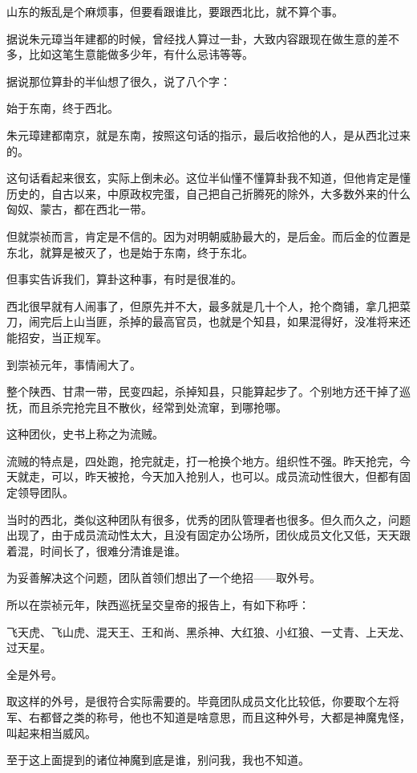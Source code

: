 	\begin{multicols}{\theparacolNo}
\fi
山东的叛乱是个麻烦事，但要看跟谁比，要跟西北比，就不算个事。

据说朱元璋当年建都的时候，曾经找人算过一卦，大致内容跟现在做生意的差不多，比如这笔生意能做多少年，有什么忌讳等等。

据说那位算卦的半仙想了很久，说了八个字：

始于东南，终于西北。

朱元璋建都南京，就是东南，按照这句话的指示，最后收拾他的人，是从西北过来的。

这句话看起来很玄，实际上倒未必。这位半仙懂不懂算卦我不知道，但他肯定是懂历史的，自古以来，中原政权完蛋，自己把自己折腾死的除外，大多数外来的什么匈奴、蒙古，都在西北一带。

但就崇祯而言，肯定是不信的。因为对明朝威胁最大的，是后金。而后金的位置是东北，就算是被灭了，也是始于东南，终于东北。

但事实告诉我们，算卦这种事，有时是很准的。

西北很早就有人闹事了，但原先并不大，最多就是几十个人，抢个商铺，拿几把菜刀，闹完后上山当匪，杀掉的最高官员，也就是个知县，如果混得好，没准将来还能招安，当正规军。

到崇祯元年，事情闹大了。

整个陕西、甘肃一带，民变四起，杀掉知县，只能算起步了。个别地方还干掉了巡抚，而且杀完抢完且不散伙，经常到处流窜，到哪抢哪。

这种团伙，史书上称之为流贼。

流贼的特点是，四处跑，抢完就走，打一枪换个地方。组织性不强。昨天抢完，今天就走，可以，昨天被抢，今天加入抢别人，也可以。成员流动性很大，但都有固定领导团队。

当时的西北，类似这种团队有很多，优秀的团队管理者也很多。但久而久之，问题出现了，由于成员流动性太大，且没有固定办公场所，团伙成员文化又低，天天跟着混，时间长了，很难分清谁是谁。

为妥善解决这个问题，团队首领们想出了一个绝招——取外号。

所以在崇祯元年，陕西巡抚呈交皇帝的报告上，有如下称呼：

飞天虎、飞山虎、混天王、王和尚、黑杀神、大红狼、小红狼、一丈青、上天龙、过天星。

全是外号。

取这样的外号，是很符合实际需要的。毕竟团队成员文化比较低，你要取个左将军、右都督之类的称号，他也不知道是啥意思，而且这种外号，大都是神魔鬼怪，叫起来相当威风。

至于这上面提到的诸位神魔到底是谁，别问我，我也不知道。


\end{multicols}

